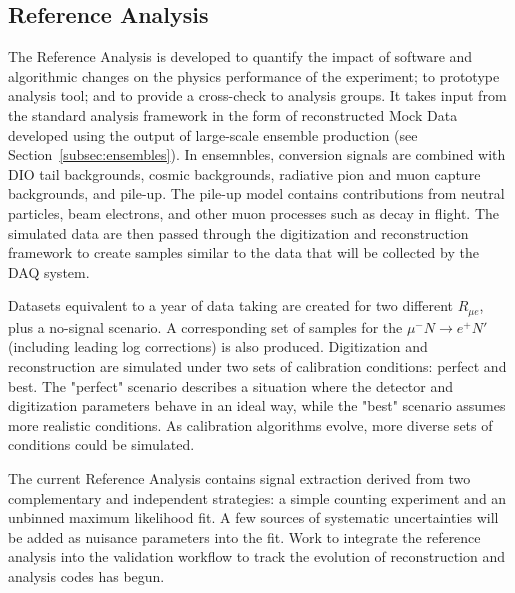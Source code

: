 \subsection{Reference Analysis}
The Reference Analysis is developed to quantify the impact of software and algorithmic changes on the physics performance of the experiment; to prototype analysis tool; and to provide a cross-check to analysis groups. It takes input from the standard analysis framework in the form of reconstructed Mock Data developed using the output of large-scale ensemble production (see Section~\ref{subsec:ensembles}). In ensemnbles, conversion signals are combined with DIO tail backgrounds, cosmic backgrounds, radiative pion and muon capture backgrounds, and pile-up. The pile-up model contains contributions from neutral particles, beam electrons, and other muon processes such as decay in flight. The simulated data are then passed through the digitization and reconstruction framework to create samples similar to the data that will be collected by the DAQ system. 

Datasets equivalent to a year of data taking are created for two different $R_{\mu e}$, plus a no-signal scenario. A corresponding set of samples for the $\mu^{-}N \rightarrow e^{+}N'$ (including leading log corrections) is also produced. Digitization and reconstruction are simulated under two sets of calibration conditions: perfect and best. The "perfect" scenario describes a situation where the detector and digitization parameters behave in an ideal way, while the "best" scenario assumes more realistic conditions. As calibration algorithms evolve, more diverse sets of conditions could be simulated.

The current Reference Analysis contains signal extraction derived from two complementary and independent strategies: a simple counting experiment and an unbinned maximum likelihood fit. A few sources of systematic uncertainties will be added as nuisance parameters into the fit. Work to integrate the reference analysis into the validation workflow to track the evolution of reconstruction and analysis codes has begun.
